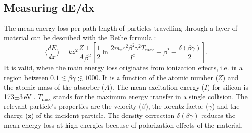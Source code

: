 \subsection{Measuring dE/dx}
The mean energy loss per path length of particles travelling through a layer of material can be described with the Bethe formula \cite{bib:Bethe_1930}:
\begin{equation}
\langle \frac{dE}{dx} \rangle = kz^2\frac{Z}{A}\frac{1}{\beta^2} [ \frac{1}{2} \ln{\frac{2m_e c^2 \beta^2 \gamma^2 T_{\text{max}}}{I^2}} - \beta^2 - \frac{\delta( \beta \gamma )}{2} ].
\end{equation}
It is valid, where the main energy loss originates from ionization effects, i.e. in a region between $0.1\lesssim\beta\gamma\lesssim 1000$.
It is a function of the atomic number ($Z$) and the atomic mass of the absorber ($A$). 
The mean excitation energy ($I$) for silicon is 173$\pm$3\,eV \cite{?}. 
$T_{\text{max}}$ stands for the maximum energy transfer in a single collision.
The relevant particle's properties are the velocity ($\beta$), the lorentz factor ($\gamma$) and the charge (z) of the incident particle.
The density correction $\delta( \beta \gamma )$ reduces the mean energy loss at high energies because of polarization effects of the material.


